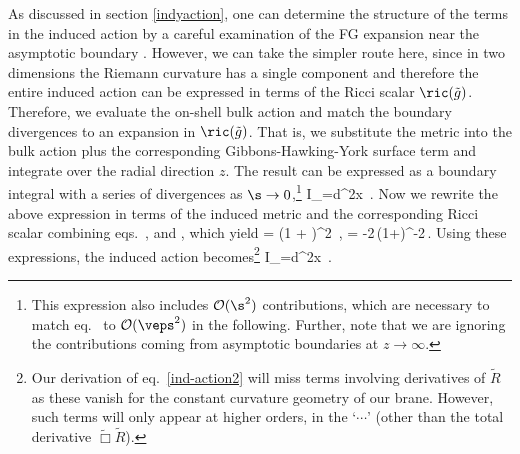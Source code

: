 As discussed in section \ref{indyaction}, one can determine the structure of the terms in the induced action by a careful examination of the FG expansion near the asymptotic boundary \cite{Skenderis:1999nb,deHaro:2000wj,deHaro:2000vlm}. However, we can take the simpler route here, since in two dimensions the Riemann curvature has a single component and therefore the entire induced action can be expressed in terms of the Ricci scalar $\ric(\tilde g)$. Therefore, we evaluate the on-shell bulk action and match the boundary divergences to an expansion in $\ric(\tilde g)$. That is, we substitute the metric  into the bulk action  plus the corresponding  Gibbons-Hawking-York surface term \cite{PhysRevLett.28.1082,Gibbons:1976ue} and integrate over the radial direction $z$. The result can be expressed as a boundary integral with a series of divergences as $\s\to0$,\footnote{This expression also includes ${\cal O}(\s^2)$ contributions, which are necessary to match eq.~ to ${\cal O}(\veps^2)$ in the following. Further, note that we are ignoring the contributions coming from asymptotic boundaries at  $z\to\infty$.}
\beq\label{induced act2}
I_=\int d^2x \,.
\eeq
Now we rewrite the above expression in terms of the induced metric and the corresponding Ricci scalar combining eqs.~,  and , which yield
\beq\label{AdS3}
 =  \left(1 + \right)^2  \,, \qquad\quad
\ric = -2\,\left(1+\right)^{-2}\,.
\eeq
Using these expressions, %
the induced action becomes\footnote{Our derivation of eq.~\eqref{ind-action2} will miss terms involving derivatives of $\tilde{R}$ as these vanish for the constant curvature geometry of our brane. However,  such terms will only appear at higher orders, \ie in the `$\cdots$' (other than the total derivative $\tilde\Box\tilde{R}$).} 
\beq\label{ind-action2}
I_=\int d^2x \,.
\eeq

